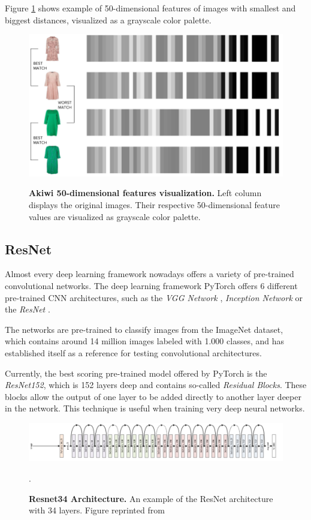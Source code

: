 \documentclass[12pt]{report}
\begin{document}
Figure \ref{fig:akiwi50_feats} shows example of 50-dimensional features of images with smallest and biggest distances, visualized as a grayscale color palette.

\begin{figure}[h]
\centering
{\includegraphics[width=.8\linewidth]{03_analysis/cbir/akiwi50_feats}}
\caption{\label{fig:akiwi50_feats} \textbf{Akiwi 50-dimensional features visualization.} Left column displays the original images. Their respective 50-dimensional feature values are visualized as grayscale color palette.}
\end{figure}


\subsection{ResNet}
Almost every deep learning framework nowadays offers a variety of pre-trained convolutional networks. The deep learning framework PyTorch offers 6 different pre-trained CNN architectures, such as the \textit{VGG Network} \cite{simonyan_very_2014}, \textit{Inception Network} \cite{szegedy_rethinking_2015} or the \textit{ResNet} \cite{he_deep_2015}. 

The networks are pre-trained to classify images from the ImageNet dataset, which contains around 14 million images labeled with 1.000 classes, and has established itself as a reference for testing convolutional architectures. 

Currently, the best scoring pre-trained model offered by PyTorch is the \textit{ResNet152}, which is 152 layers deep and contains so-called \textit{Residual Blocks}. These blocks allow the output of one layer to be added directly to another layer deeper in the network. This technique is useful when training very deep neural networks.

\begin{figure}[h]
\centering
{\includegraphics[width=\linewidth]{02_background/CBIR/resnet_arch}}
\caption{\label{fig:resnet34} \textbf{Resnet34 Architecture.} An example of the ResNet architecture with 34 layers. Figure reprinted from \cite{noauthor_resnet-152_nodate}}.
\end{figure}
\end{document}
